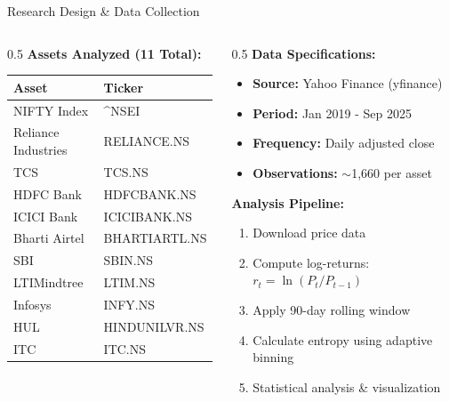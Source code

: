 \documentclass[aspectratio=169,12pt,xcolor=table]{beamer}
\begin{document}
\begin{frame}{Research Design \& Data Collection}
\begin{columns}[T]
\begin{column}{0.5\textwidth}
    \textbf{Assets Analyzed (11 Total):}
    \begin{table}[h]
    \tiny
    \begin{tabular}{ll}
    \toprule
    \textbf{Asset} & \textbf{Ticker} \\
    \midrule
    \rowcolor{niftyblue!20} NIFTY Index & \textasciicircum{}NSEI \\
    Reliance Industries & RELIANCE.NS \\
    \rowcolor{lightgray} TCS & TCS.NS \\
    HDFC Bank & HDFCBANK.NS \\
    \rowcolor{lightgray} ICICI Bank & ICICIBANK.NS \\
    Bharti Airtel & BHARTIARTL.NS \\
    \rowcolor{lightgray} SBI & SBIN.NS \\
    LTIMindtree & LTIM.NS \\
    \rowcolor{lightgray} Infosys & INFY.NS \\
    HUL & HINDUNILVR.NS \\
    \rowcolor{lightgray} ITC & ITC.NS \\
    \bottomrule
    \end{tabular}
    \end{table}
\end{column}

\begin{column}{0.5\textwidth}
    \textbf{Data Specifications:}
    \begin{itemize}
        \item \textbf{Source:} Yahoo Finance (yfinance)
        \item \textbf{Period:} Jan 2019 - Sep 2025
        \item \textbf{Frequency:} Daily adjusted close
        \item \textbf{Observations:} $\sim$1,660 per asset
    \end{itemize}
    
    \vspace{0.1cm}
    \textbf{Analysis Pipeline:}
    \begin{enumerate}
        \item Download price data
        \item Compute log-returns: $r_t = \ln(P_t/P_{t-1})$
        \item Apply 90-day rolling window
        \item Calculate entropy using adaptive binning
        \item Statistical analysis \& visualization
    \end{enumerate}
\end{column}
\end{columns}
\end{frame}
\end{document}
